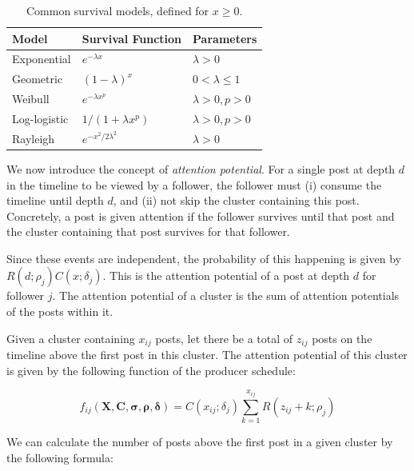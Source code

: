 \documentclass[onecolumn, 12 pt, doublespace, fullpage, letterpaper]{report}
\begin{document}
\begin{table}
  \centering
  \selectfont
  \begin{tabular}{lll}
    \toprule
    \textbf{Model} & \textbf{Survival Function} & \textbf{Parameters} \\
    \midrule
    Exponential   & $e^{-\lambda x}$             & $\lambda>0$\\
    Geometric     & $(1 - \lambda)^{x}$          & $0<\lambda \leq 1$\\
    Weibull       & $e^{-\lambda x^p}$           & $\lambda>0, p>0$\\
    Log-logistic  & $1 / (1 + \lambda x^p)$      & $\lambda>0, p>0$\\
    Rayleigh      & $e^{-x^2/2\lambda^2}$        & $\lambda>0$\\
    \bottomrule
  \end{tabular}
  \caption[Common survival models.]{Common survival models, defined for $x \geq 0$.}
  \label{table:survival-functions}
\end{table}

We now introduce the concept of \textit{attention potential}. For a single post at depth $d$ in the timeline to be viewed by a follower, the follower must (i) consume the timeline until depth $d$, and (ii) not skip the cluster containing this post. Concretely, a post is given attention if the follower survives until that post and the cluster containing that post survives for that follower.

Since these events are independent, the probability of this happening is given by $R(d;\rho_j)C(x;\delta_j)$. This is the attention potential of a post at depth $d$ for follower $j$. The attention potential of a cluster is the sum of attention potentials of the posts within it.

Given a cluster containing $x_{ij}$ posts, let there be a total of $z_{ij}$ posts on the timeline above the first post in this cluster. The attention potential of this cluster is given by the following function of the producer schedule:

\begin{equation}
  f_{ij}(\mathbf{X}, \mathbf{C}, \boldsymbol\sigma, \boldsymbol\rho, \boldsymbol\delta) = C(x_{ij};\delta_j)\sum_{k=1}^{x_{ij}}R(z_{ij} + k;\rho_j)
  \label{eq:slot-value}
\end{equation}

We can calculate the number of posts above the first post in a given cluster by the following formula:
\end{document}

